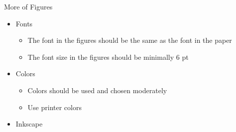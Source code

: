 \documentclass{beamer}
\begin{document}
\begin{frame}{More of Figures}
    \begin{itemize}
        \item Fonts
        \begin{itemize}
            \item The font in the figures should be the same as the font in the paper
            \item The font size in the figures should be minimally 6 pt
        \end{itemize}
        \item Colors
        \begin{itemize}
            \item Colors should be used and chosen moderately
            \item Use printer colors
        \end{itemize}
        \item Inkscape
    \end{itemize}
\end{frame}
\end{document}
